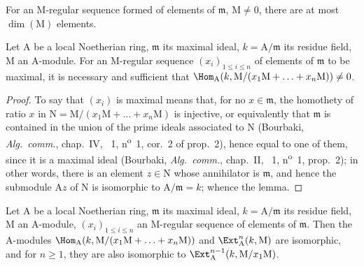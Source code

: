 For an $\mathrm{M}$-regular sequence formed of elements of $\mathfrak{m}$, $\mathrm{M}\neq 0$, there are at most $\dim(\mathrm{M})$ elements.

\begin{lemma}[16.4.2]
\label{0.16.4.2}
Let $\mathrm{A}$ be a local Noetherian ring, $\mathfrak{m}$ its maximal ideal, $k=\mathrm{A}/\mathfrak{m}$ its residue field, $\mathrm{M}$ an $\mathrm{A}$-module.
For an $\mathrm{M}$-regular sequence $(x_i)_{1\leq i\leq n}$ of elements of $\mathfrak{m}$ to be maximal, it is necessary and sufficient that $\Hom_\mathrm{A}(k,\mathrm{M}/(x_1\mathrm{M}+\ldots+x_n\mathrm{M}))\neq 0$.
\end{lemma}

\begin{proof}
To say that $(x_i)$ is maximal means that, for no $x\in\mathfrak{m}$, the homothety of ratio $x$ in $\mathrm{N}=\mathrm{M}/(x_1\mathrm{M}+\ldots+x_n\mathrm{M})$ is injective, or equivalently that $\mathfrak{m}$ is contained in the union of the prime ideals associated to $\mathrm{N}$ (Bourbaki, \emph{Alg.~comm.}, chap.~IV, \textsection~1, n\textsuperscript{o}~1, cor.~2 of prop.~2), hence equal to one of them, since it is a  maximal ideal (Bourbaki, \emph{Alg.~comm.}, chap.~II, \textsection~1, n\textsuperscript{o}~1, prop.~2); in other words, there is an element $z\in\mathrm{N}$ whose annihilator is $\mathfrak{m}$, and hence the submodule $\mathrm{A}z$ of $\mathrm{N}$ is isomorphic to $\mathrm{A}/\mathfrak{m}=k$; whence the lemma.
\end{proof}

\begin{lemma}[16.4.3]
\label{0.16.4.3}
Let $\mathrm{A}$ be a local Noetherian ring, $\mathfrak{m}$ its maximal ideal, $k=\mathrm{A}/\mathfrak{m}$ its residue field, $\mathrm{M}$ an $\mathrm{A}$-module, $(x_i)_{1\leq i\leq n}$ an $\mathrm{M}$-regular sequence of elements of $\mathfrak{m}$.
Then the $\mathrm{A}$-modules $\Hom_\mathrm{A}(k,\mathrm{M}/(x_1\mathrm{M}+\ldots+x_n\mathrm{M}))$ and $\Ext^n_\mathrm{A}(k,\mathrm{M})$ are isomorphic, and for $n\geq 1$, they are also isomorphic to $\Ext^{n-1}_\mathrm{A}(k,\mathrm{M}/x_1\mathrm{M})$.
\end{lemma}

